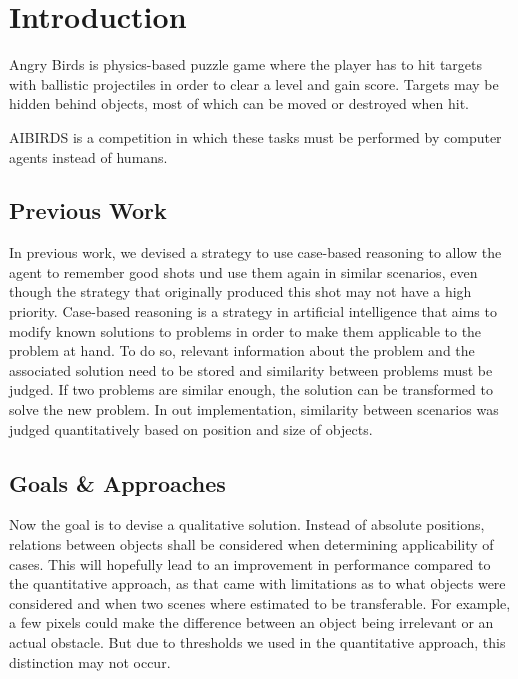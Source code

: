 \section{Introduction}\label{sec:intro}

Angry Birds is physics-based puzzle game where the player has to hit targets with ballistic projectiles in order to clear a level and gain score.
Targets may be hidden behind objects, most of which can be moved or destroyed when hit.

AIBIRDS is a competition in which these tasks must be performed by computer agents instead of humans.


\subsection{Previous Work}
In previous work, we devised a strategy to use case-based reasoning to allow the agent to remember good shots und use them again in similar scenarios, even though the strategy that originally produced this shot may not have a high priority.
Case-based reasoning is a strategy in artificial intelligence that aims to modify known solutions to problems in order to make them applicable to the problem at hand.
To do so, relevant information about the problem and the associated solution need to be stored and similarity between problems must be judged.
If two problems are similar enough, the solution can be transformed to solve the new problem.
In out implementation, similarity between scenarios was judged quantitatively based on position and size of objects.


\subsection{Goals \& Approaches}

Now the goal is to devise a qualitative solution.
Instead of absolute positions, relations between objects shall be considered when determining applicability of cases.
This will hopefully lead to an improvement in performance compared to the quantitative approach, as that came with limitations as to what objects were considered and when two scenes where estimated to be transferable. %
For example, a few pixels could make the difference between an object being irrelevant or an actual obstacle. 
But due to thresholds we used in the quantitative approach, this distinction may not occur. %

